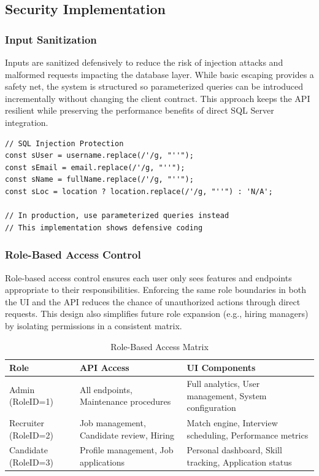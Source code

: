 \documentclass[11pt,a4paper]{article}
\begin{document}
\subsection{Security Implementation}

\subsubsection*{Input Sanitization}
Inputs are sanitized defensively to reduce the risk of injection attacks and malformed requests impacting the database layer. While basic escaping provides a safety net, the system is structured so parameterized queries can be introduced incrementally without changing the client contract. This approach keeps the API resilient while preserving the performance benefits of direct SQL Server integration.

\begin{verbatim}
// SQL Injection Protection
const sUser = username.replace(/'/g, "''");
const sEmail = email.replace(/'/g, "''");
const sName = fullName.replace(/'/g, "''");
const sLoc = location ? location.replace(/'/g, "''") : 'N/A';

// In production, use parameterized queries instead
// This implementation shows defensive coding
\end{verbatim}

\subsubsection*{Role-Based Access Control}
Role-based access control ensures each user only sees features and endpoints appropriate to their responsibilities. Enforcing the same role boundaries in both the UI and the API reduces the chance of unauthorized actions through direct requests. This design also simplifies future role expansion (e.g., hiring managers) by isolating permissions in a consistent matrix.

\begin{table}[H]
    \centering
    \begin{tabularx}{\textwidth}{|l|X|X|}
        \hline
        \rowcolor{tableheader}
        \textbf{Role} & \textbf{API Access} & \textbf{UI Components} \\
        \hline
        Admin (RoleID=1) & All endpoints, Maintenance procedures & Full analytics, User management, System configuration \\
        \hline
        Recruiter (RoleID=2) & Job management, Candidate review, Hiring & Match engine, Interview scheduling, Performance metrics \\
        \hline
        Candidate (RoleID=3) & Profile management, Job applications & Personal dashboard, Skill tracking, Application status \\
        \hline
    \end{tabularx}
    \caption{Role-Based Access Matrix}
\end{table}
\end{document}

